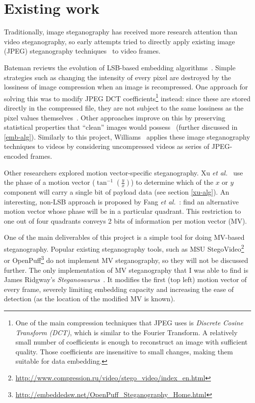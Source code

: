 \documentclass[12pt,british,twoside,notitlepage,usenames,dvipsnames,hypens,final]{report}
\numberwithin{equation}{section}
\numberwithin{figure}{section}
\begin{document}
\section{Existing work}
Traditionally, image steganography has received more research attention than video steganography, so early attempts tried to directly apply existing image (JPEG) steganography techniques~\cite{bateman, jpegdctcoding} to video frames.

Bateman reviews the evolution of LSB-based embedding algorithms~\cite{bateman}. Simple strategies such as changing the intensity of every pixel are destroyed by the lossiness of image compression when an image is recompressed. One approach for solving this was to modify JPEG DCT coefficients\footnote{
One of the main compression techniques that JPEG uses is \emph{Discrete Cosine Transform (DCT)}, which is similar to the Fourier Transform. A relatively small number of coefficients is enough to reconstruct an image with sufficient quality. Those coefficients are insensitive to small changes, making them suitable for data embedding.} instead: since these are stored directly in the compressed file, they are not subject to the same lossiness as the pixel values themselves~\cite{jpegdctcoding}. Other approaches improve on this by preserving statistical properties that ``clean'' images would possess~\cite{bateman, f5} (further discussed in \ref{emb-alg}). Similarly to this project, Williams~\cite{scott-fs} applies these image steganography techniques to videos by considering uncompressed videos as series of JPEG-encoded frames.

Other researchers explored motion vector-specific steganography. Xu \emph{et al.}~\cite{xu2006steganography} use the phase of a motion vector ($\tan^{-1}(\frac{y}{x})$) to determine which of the $x$ or $y$ component will carry a single bit of payload data (see section \ref{xu-alg}). An interesting, non-LSB approach is proposed by Fang \emph{et al.}~\cite{fang2006data}: find an alternative motion vector whose phase will be in a particular quadrant. This restriction to one out of four quadrants conveys 2 bits of information per motion vector (MV).

One of the main deliverables of this project is a simple tool for doing MV-based steganography. Popular existing steganography tools, such as MSU StegoVideo\footnote{\url{http://www.compression.ru/video/stego_video/index_en.html}} or OpenPuff\footnote{\url{http://embeddedsw.net/OpenPuff_Steganography_Home.html}} do not implement MV steganography, so they will not be discussed further. The only implementation of MV steganography that I was able to find is James Ridgway's \emph{Steganosaurus}~\cite{steganosaurus}. It modifies the first (top left) motion vector of every frame, severely limiting embedding capacity and increasing the ease of detection (as the location of the modified MV is known).
\end{document}
